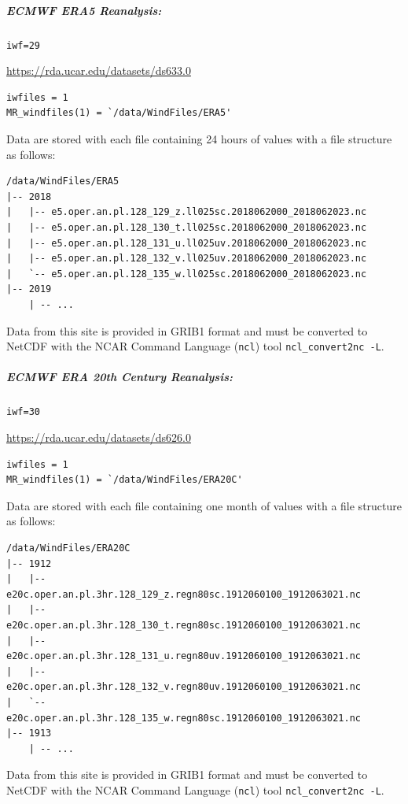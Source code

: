 \documentclass[11pt]{article}   %
\begin{document}
\subparagraph{ECMWF ERA5 Reanalysis:}
\texttt{iwf=29}

\url{https://rda.ucar.edu/datasets/ds633.0}
\begin{verbatim}
iwfiles = 1
MR_windfiles(1) = `/data/WindFiles/ERA5'
\end{verbatim}
Data are stored with each file containing 24 hours of values with a file structure as follows:
\begin{verbatim}
/data/WindFiles/ERA5
|-- 2018
|   |-- e5.oper.an.pl.128_129_z.ll025sc.2018062000_2018062023.nc
|   |-- e5.oper.an.pl.128_130_t.ll025sc.2018062000_2018062023.nc
|   |-- e5.oper.an.pl.128_131_u.ll025uv.2018062000_2018062023.nc
|   |-- e5.oper.an.pl.128_132_v.ll025uv.2018062000_2018062023.nc
|   `-- e5.oper.an.pl.128_135_w.ll025sc.2018062000_2018062023.nc
|-- 2019
    | -- ...
\end{verbatim}
Data from this site is provided in GRIB1 format and must be converted to NetCDF
with the NCAR Command Language (\texttt{ncl}) tool \texttt{ncl\_convert2nc -L}.

\subparagraph{ECMWF ERA 20th Century Reanalysis:}
\texttt{iwf=30}

\url{https://rda.ucar.edu/datasets/ds626.0}
\begin{verbatim}
iwfiles = 1
MR_windfiles(1) = `/data/WindFiles/ERA20C'
\end{verbatim}
Data are stored with each file containing one month of values with a file structure as follows:
\begin{verbatim}
/data/WindFiles/ERA20C
|-- 1912
|   |-- e20c.oper.an.pl.3hr.128_129_z.regn80sc.1912060100_1912063021.nc
|   |-- e20c.oper.an.pl.3hr.128_130_t.regn80sc.1912060100_1912063021.nc
|   |-- e20c.oper.an.pl.3hr.128_131_u.regn80uv.1912060100_1912063021.nc
|   |-- e20c.oper.an.pl.3hr.128_132_v.regn80uv.1912060100_1912063021.nc
|   `-- e20c.oper.an.pl.3hr.128_135_w.regn80sc.1912060100_1912063021.nc
|-- 1913
    | -- ...
\end{verbatim}
Data from this site is provided in GRIB1 format and must be converted to NetCDF
with the NCAR Command Language (\texttt{ncl}) tool \texttt{ncl\_convert2nc -L}.
\end{document}
